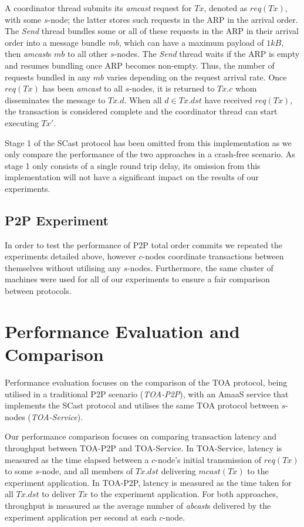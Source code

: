 	A coordinator thread submits its \emph{amcast} request for $Tx$, denoted as $req(Tx)$, with some $s$-node; the latter stores such requests in the ARP in the arrival order. The \emph{Send} thread bundles some or all of these requests in the ARP in their arrival order into a message bundle $mb$, which can have a maximum payload of $1kB$, then \emph{amcast}s $mb$ to all other $s$-nodes.  The \emph{Send} thread waits if the ARP is empty and resumes bundling once ARP becomes non-empty. Thus, the number of requests bundled in any $mb$ varies depending on the request arrival rate. Once $req(Tx)$ has been \emph{amcast} to all $s$-nodes, it is returned to $Tx.c$ whom disseminates the message to $Tx.d$.  When all $d \in Tx.dst$ have received $req(Tx)$, the transaction is considered complete and the coordinator thread can start executing $Tx'$.  
	
	Stage 1 of the \textsf{SCast} protocol has been omitted from this implementation as we only compare the performance of the two approaches in a crash-free scenario.  As stage 1 only consists of a single round trip delay, its omission from this implementation will not have a significant impact on the results of our experiments.  
	
	\subsection*{P2P Experiment}
	In order to test the performance of P2P total order commits we repeated the  experiments detailed above, however $c$-nodes coordinate transactions between themselves without utilising any $s$-nodes.  Furthermore, the same cluster of machines were used for all of our experiments to ensure a fair comparison between protocols.   
	
	\section{Performance Evaluation and Comparison}\label{sec:AmaaS_results}
	Performance evaluation focuses on the comparison of the TOA protocol, being utilised in a traditional P2P scenario (\emph{TOA-P2P}), with an \textsf{AmaaS} service that implements the \textsf{SCast} protocol and utilises the same TOA protocol between $s$-nodes (\emph{TOA-Service}).
	
	Our performance comparison focuses on comparing transaction latency and throughput between TOA-P2P and TOA-Service.  In TOA-Service, latency is measured as the time elapsed between a $c$-node's initial transmission of $req(Tx)$ to some $s$-node, and all members of $Tx.dst$ delivering $mcast(Tx)$ to the experiment application. In TOA-P2P, latency is measured as the time taken for all $Tx.dst$ to deliver $Tx$ to the experiment application. For both approaches, throughput is measured as the average number of \emph{abcast}s delivered by the experiment application per second at each $c$-node.
	
